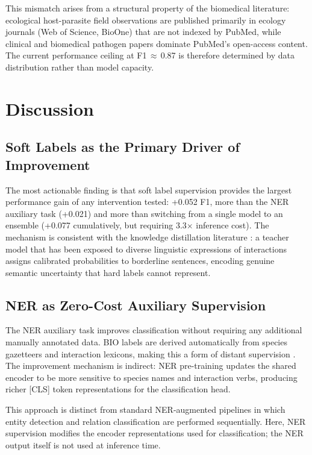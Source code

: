 \documentclass[12pt,a4paper]{article}
\begin{document}
This mismatch arises from a structural property of the biomedical literature:
ecological host-parasite field observations are published primarily in
ecology journals (Web of Science, BioOne) that are not indexed by PubMed,
while clinical and biomedical pathogen papers dominate PubMed's open-access
content. The current performance ceiling at F1\,$\approx$\,0.87 is therefore
determined by data distribution rather than model capacity.

\section{Discussion}
\label{sec:discussion}

\subsection{Soft Labels as the Primary Driver of Improvement}

The most actionable finding is that soft label supervision provides the
largest performance gain of any intervention tested: +0.052 F1, more than
the NER auxiliary task (+0.021) and more than switching from a single model
to an ensemble (+0.077 cumulatively, but requiring 3.3$\times$ inference cost).
The mechanism is consistent with the knowledge distillation literature
\citep{hinton2015distilling, tang2019distilling}: a teacher model that has
been exposed to diverse linguistic expressions of interactions assigns
calibrated probabilities to borderline sentences, encoding genuine semantic
uncertainty that hard labels cannot represent.

\subsection{NER as Zero-Cost Auxiliary Supervision}

The NER auxiliary task improves classification without requiring any
additional manually annotated data. BIO labels are derived automatically
from species gazetteers and interaction lexicons, making this a form of
distant supervision \citep{mintz2009distant}. The improvement mechanism is
indirect: NER pre-training updates the shared encoder to be more sensitive
to species names and interaction verbs, producing richer [CLS] token
representations for the classification head.

This approach is distinct from standard NER-augmented pipelines
\citep{habibi2017deep} in which entity detection and relation classification
are performed sequentially. Here, NER supervision modifies the encoder
representations used for classification; the NER output itself is not used
at inference time.
\end{document}
